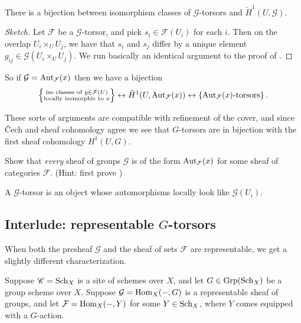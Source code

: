 \documentclass[11pt,openany]{book}
\begin{document}
\begin{theorem} There is a bijection between isomorphism classes of $\mathcal{G}$-torsors and $\check{H}^1(U,\mathcal{G})$.
\end{theorem}
\begin{proof}[Sketch] Let $\mathcal{F}$ be a $\mathcal{G}$-torsor, and pick $s_i \in \mathcal{F}(U_i)$ for each $i$. Then on the overlap $U_i \times_U U_j$, we have that $s_i$ and $s_j$ differ by a unique element $g_{ij}\in \mathcal{G}(U_i \times_U U_j)$. We run basically an identical argument to the proof of .
\end{proof}

So if $\mathcal{G} = \mathrm{Aut}_{\mathcal{F}}(x)$ then we have a bijection
\begin{align*}
    \left\{ \substack{\text{iso classes of }y\in \mathcal{F}(U) \\ \text{locally isomorphic to }x} \right\} \leftrightarrow \check{H}^1(U,\mathrm{Aut}_{\mathcal{F}}(x)) \leftrightarrow \left\{ \mathrm{Aut}_\mathcal{F}(x)\text{-torsors} \right\}.
\end{align*}

These sorts of arguments are compatible with refinement of the cover, and since \v{C}ech and sheaf cohomology agree we see that $G$-torsors are in bijection with the first sheaf cohomology $H^1(U,G)$.


%
\begin{exercise}\label{exer:every-sheaf-of-groups-is-aut} 
Show that \textit{every} sheaf of groups $\mathcal{G}$ is of the form $\mathrm{Aut}_\mathcal{F}(x)$ for some sheaf of categories $\mathcal{F}$. (Hint: first prove )
\end{exercise}

\begin{intuition} A $\mathcal{G}$-torsor is an object whose automorphisms locally look like $\mathcal{G}(U_i)$.
\end{intuition}

\subsection{Interlude: representable $G$-torsors}

When both the presheaf $\mathcal{G}$ and the sheaf of sets $\mathcal{F}$ are representable, we get a slightly different characterization. 

\begin{setup}\label{set:representable-torsor-and-group-scheme} Suppose $\mathscr{C} = \mathrm{Sch}_X$ is a site of schemes over $X$, and let $G \in \mathrm{Grp}(\mathrm{Sch}_X)$ be a group scheme over $X$. Suppose $\mathcal{G} = \mathrm{Hom}_X(-,G)$ is a representable sheaf of groups, and let $\mathcal{F} = \mathrm{Hom}_X(-,Y)$ for some $Y\in \mathrm{Sch}_X$, where $Y$ comes equipped with a $G$-action.
\end{setup}
\end{document}
